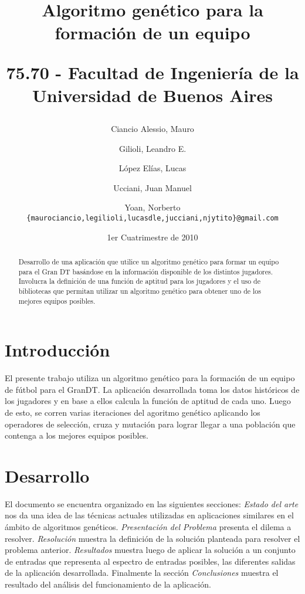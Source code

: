 \documentclass[pdftex,a4paper,10.5pt]{article}
\title{\textbf{Algoritmo gen\'etico para la formaci\'on de un equipo}\\
\begin{normalsize}75.70 - Facultad de Ingenier\'ia de la Universidad de Buenos Aires\end{normalsize} }
\author{
	Ciancio Alessio, Mauro \and
	Gilioli, Leandro E. \and
	L\'opez El\'ias, Lucas \and
	Ucciani, Juan Manuel \and
	Yoan, Norberto \\
	\texttt{\{maurociancio,legilioli,lucasdle,jucciani,njytito\}@gmail.com}
	}
\date{1er Cuatrimestre de 2010}
\begin{document}
\maketitle

\begin{abstract}
	Desarrollo de una aplicaci\'on que utilice un algoritmo gen\'etico para formar un equipo para el Gran DT \cite{grandt} bas\'andose en la informaci\'on disponible de los distintos jugadores. Involucra la definici\'on de una funci\'on de aptitud para los jugadores y el uso de bibliotecas que permitan utilizar un algoritmo gen\'etico para obtener uno de los mejores equipos posibles. 
\end{abstract}

\thispagestyle{empty}

\section{Introducci\'on}
El presente trabajo utiliza un algoritmo gen\'etico para la formaci\'on de un equipo de f\'utbol para el GranDT. La aplicaci\'on desarrollada toma los datos hist\'oricos de los jugadores y en base a ellos calcula la funci\'on de aptitud de cada uno. Luego de esto, se corren varias iteraciones del agoritmo gen\'etico aplicando los operadores de selecci\'on, cruza y mutaci\'on para lograr llegar a una poblaci\'on que contenga a los mejores equipos posibles.


\section{Desarrollo}
El documento se encuentra organizado en las siguientes secciones:
\textit{Estado del arte} nos da una idea de las t\'ecnicas actuales utilizadas en aplicaciones similares en el ámbito de algoritmos gen\'eticos. 
\textit{Presentaci\'on del Problema} presenta el dilema a resolver.
\textit{Resoluci\'on} muestra la definici\'on de la soluci\'on planteada para resolver el problema anterior. 
\textit{Resultados} muestra luego de aplicar la soluci\'on a un conjunto de entradas que representa al espectro de entradas posibles, las diferentes salidas de la aplicaci\'on desarrollada.
Finalmente la secci\'on \textit{Conclusiones} muestra el resultado del an\'alisis del funcionamiento de la aplicaci\'on.
\end{document}
